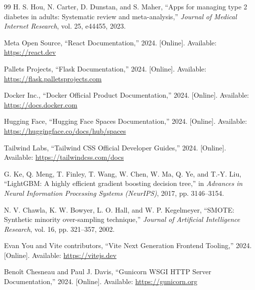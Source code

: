 \documentclass[12pt,a4paper]{report}
\begin{document}
\begin{thebibliography}{99}
H. S. Hou, N. Carter, D. Dunstan, and S. Maher, ``Apps for managing type 2 diabetes in adults: Systematic review and meta-analysis,'' \emph{Journal of Medical Internet Research}, vol. 25, e44455, 2023.

Meta Open Source, ``React Documentation,'' 2024. [Online]. Available: \url{https://react.dev}

Pallets Projects, ``Flask Documentation,'' 2024. [Online]. Available: \url{https://flask.palletsprojects.com}

Docker Inc., ``Docker Official Product Documentation,'' 2024. [Online]. Available: \url{https://docs.docker.com}

Hugging Face, ``Hugging Face Spaces Documentation,'' 2024. [Online]. Available: \url{https://huggingface.co/docs/hub/spaces}

Tailwind Labs, ``Tailwind CSS Official Developer Guides,'' 2024. [Online]. Available: \url{https://tailwindcss.com/docs}

G. Ke, Q. Meng, T. Finley, T. Wang, W. Chen, W. Ma, Q. Ye, and T.-Y. Liu, ``LightGBM: A highly efficient gradient boosting decision tree,'' in \emph{Advances in Neural Information Processing Systems (NeurIPS)}, 2017, pp. 3146--3154.

N. V. Chawla, K. W. Bowyer, L. O. Hall, and W. P. Kegelmeyer, ``SMOTE: Synthetic minority over-sampling technique,'' \emph{Journal of Artificial Intelligence Research}, vol. 16, pp. 321--357, 2002.

Evan You and Vite contributors, ``Vite Next Generation Frontend Tooling,'' 2024. [Online]. Available: \url{https://vitejs.dev}

Benoît Chesneau and Paul J. Davis, ``Gunicorn WSGI HTTP Server Documentation,'' 2024. [Online]. Available: \url{https://gunicorn.org}

\end{thebibliography}
\end{document}
